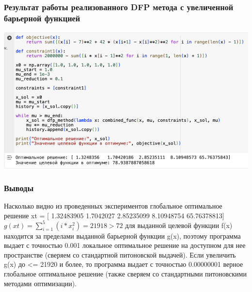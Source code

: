 \documentclass[12pt,pdf,hyperref={unicode}]{beamer}
\begin{document}
\begin{frame}
\frametitle{Результат работы реализованного DFP метода с увеличенной барьерной функцией}
\begin{center}
    \includegraphics[width=1\textwidth]{my_optim_const.png}
\end{center}
\end{frame}

\begin{frame}
\frametitle{Выводы}
Насколько видно из проведенных экспериментов глобальное оптимальное решение xt = [ 1.32483905  1.7042027   2.85235099  8.10948754 65.76378813]
$g(xt) = \sum_{i=1}^5(i*x_i^2) = 21918 > 72$
для выданной целевой функции f(x) находится за пределами выданной барьерной функции g(x), поэтому программа выдает с точностью 0.001 локальное оптимальное решение на доступном для нее пространстве (сверяем со стандартной питоновской выдачей). Если увеличить g(x) до <= 21920 и более, то программа выдает с точностью 0.00000001 верное глобальное оптимальное решение (также сверяем со стандартными питоновскими методами оптимизации). 
\end{frame}
\end{document}
